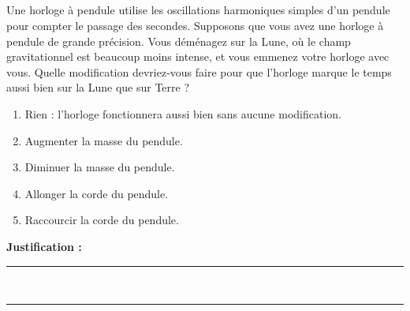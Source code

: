 \subsection{}
Une horloge à pendule utilise les oscillations harmoniques simples d’un pendule pour compter le passage des secondes. Supposons que vous avez une horloge à pendule de grande précision. Vous déménagez sur la Lune, où le champ gravitationnel est beaucoup moins intense, et vous emmenez votre horloge avec vous. Quelle modification devriez-vous faire pour que l’horloge marque le temps aussi bien sur la Lune que sur Terre ?

\begin{enumerate}[label=\Alph*)]
    \item Rien : l’horloge fonctionnera aussi bien sans aucune modification.
    \item Augmenter la masse du pendule.
    \item Diminuer la masse du pendule.
    \item Allonger la corde du pendule.
    \item Raccourcir la corde du pendule.
\end{enumerate}
\noindent\textbf{Justification :} \hrulefill \\[2.5ex]
\rule{\linewidth}{0.4pt} \\[2.5ex]
\rule{\linewidth}{0.4pt}
\vfill